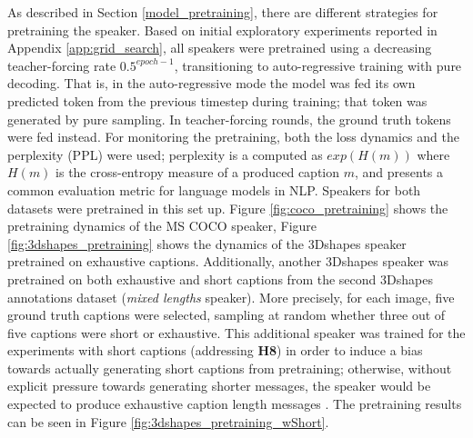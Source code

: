 As described in Section \ref{model_pretraining}, there are different strategies for pretraining the speaker. Based on initial exploratory experiments reported in Appendix \ref{app:grid_search}, all speakers were pretrained using a decreasing teacher-forcing rate $0.5^{epoch-1}$, transitioning to auto-regressive training with pure decoding. That is, in the auto-regressive mode the model was fed its own predicted token from the previous timestep during training; that token was generated by pure sampling. In teacher-forcing rounds, the ground truth tokens were fed instead. For monitoring the pretraining, both the loss dynamics and the perplexity (PPL) were used; perplexity is a computed as $exp(H(m))$ where $H(m)$ is the cross-entropy measure of a produced caption $m$, and presents a common evaluation metric for language models in NLP.
Speakers for both datasets were pretrained in this set up. Figure \ref{fig:coco_pretraining} shows the pretraining dynamics of the MS COCO speaker, Figure \ref{fig:3dshapes_pretraining} shows the dynamics of the 3Dshapes speaker pretrained on exhaustive captions. Additionally, another 3Dshapes speaker was pretrained on both exhaustive and short captions from the second 3Dshapes annotations dataset (\textit{mixed lengths} speaker). More precisely, for each image, five ground truth captions were selected, sampling at random whether three out of five captions were short or exhaustive. This additional speaker was trained for the experiments with short captions (addressing \textbf{H8}) in order to induce a bias towards actually generating short captions from pretraining; otherwise, without explicit pressure towards generating shorter messages, the speaker would be expected to produce exhaustive caption length messages \parencite[cf., e.g.,][]{hupkes2020compositionality}. The pretraining results can be seen in Figure \ref{fig:3dshapes_pretraining_wShort}.

